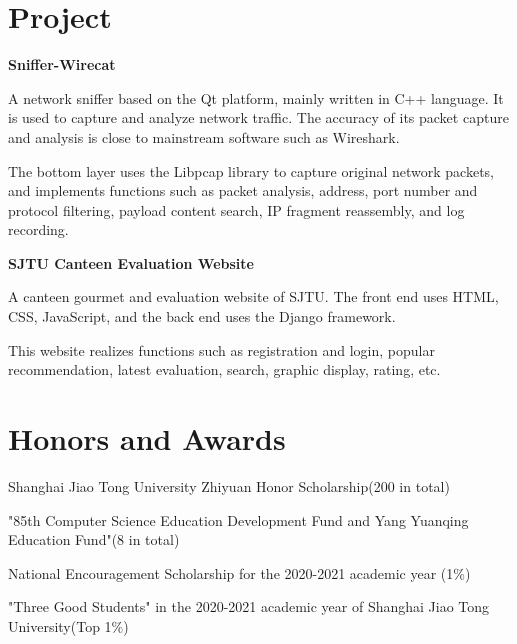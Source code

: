 \documentclass{cv_en}
\begin{document}
\section{Project}
\textbf{Sniffer-Wirecat}\enskip \underline{\href{https://github.com/ysyszheng/wirecat}{\faGithub}}
\begin{zitemize}
  \item A network sniffer based on the Qt platform, mainly written in C++ language. It is used to capture and analyze network traffic. The accuracy of its packet capture and analysis is close to mainstream software such as Wireshark.
  \item The bottom layer uses the Libpcap library to capture original network packets, and implements functions such as packet analysis, address, port number and protocol filtering, payload content search, IP fragment reassembly, and log recording.
\end{zitemize}

\textbf{SJTU Canteen Evaluation Website}\enskip \underline{\href{https://github.com/WxxW2002/SJTU-canteen}{\faGithub}}
\begin{zitemize}
  \item A canteen gourmet and evaluation website of SJTU. The front end uses HTML, CSS, JavaScript, and the back end uses the Django framework.
  \item This website realizes functions such as registration and login, popular recommendation, latest evaluation, search, graphic display, rating, etc.
\end{zitemize}

\section{Honors and Awards}
\begin{zitemize}
  \item Shanghai Jiao Tong University Zhiyuan Honor Scholarship(200 in total)
  \item "85th Computer Science Education Development Fund and Yang Yuanqing Education Fund"(8 in total)
  \item National Encouragement Scholarship for the 2020-2021 academic year (1\%)
  \item "Three Good Students" in the 2020-2021 academic year of Shanghai Jiao Tong University(Top 1\%)
\end{zitemize}

\end{document}
